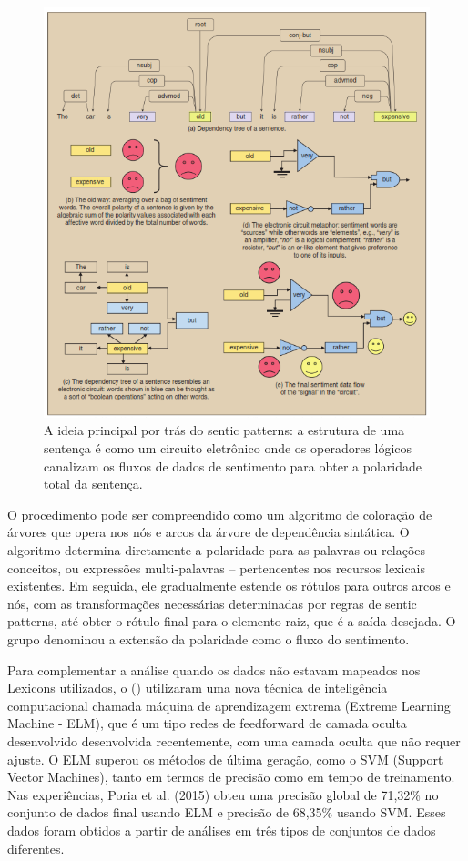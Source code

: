 \documentclass[
	12pt,				%
	openright,			%
	oneside,			%
	a4paper,			%
	english,			%
	spanish,			%
	brazil				%
	]{abntex2}
\begin{document}
\begin{figure}[!htb]
\centering
\includegraphics{senticPatternsCircuit}
\caption{A ideia principal por trás do sentic patterns: a estrutura de uma sentença é como um circuito eletrônico onde os operadores lógicos canalizam os fluxos de dados de sentimento para obter a polaridade total da sentença. \cite{article_sentiment_analysis}}
\label{senticPatternsCircuit}
\end{figure}

O procedimento pode ser compreendido como um algoritmo de coloração de árvores que opera nos nós e arcos da árvore de dependência sintática. O algoritmo determina diretamente a polaridade para as palavras ou relações - conceitos, ou expressões multi-palavras – pertencentes nos recursos lexicais existentes. Em seguida, ele gradualmente estende os rótulos para outros arcos e nós, com as transformações necessárias determinadas por regras de sentic patterns, até obter o rótulo final para o elemento raiz, que é a saída desejada. O grupo denominou a extensão da polaridade como o fluxo do sentimento.

Para complementar a análise quando os dados não estavam mapeados nos Lexicons utilizados, o \citeauthor{article_sentiment_analysis} (\citeyear{article_sentiment_analysis}) utilizaram uma nova técnica de inteligência computacional chamada máquina de aprendizagem extrema (Extreme Learning Machine - ELM), que é um tipo redes de feedforward de camada oculta desenvolvido desenvolvida recentemente, com uma camada oculta que não requer ajuste. O ELM superou os métodos de última geração, como o SVM (Support Vector Machines), tanto em termos de precisão como em tempo de treinamento. Nas experiências, Poria et al. (2015) obteu uma precisão global de 71,32\% no conjunto de dados final usando ELM e precisão de 68,35\% usando SVM. Esses dados foram obtidos a partir de análises em três tipos de conjuntos de dados diferentes.
\end{document}
